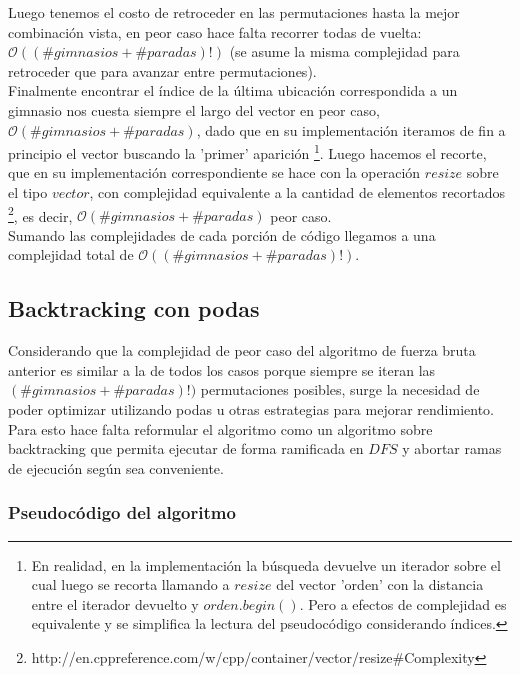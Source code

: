     Luego tenemos el costo de retroceder en las permutaciones hasta la mejor combinación vista, en peor caso hace falta recorrer todas de vuelta: $\mathcal{O}((\#gimnasios + \#paradas)!)$ (se asume la misma complejidad para retroceder que para avanzar entre permutaciones).
    \\

    Finalmente encontrar el índice de la última ubicación correspondida a un gimnasio nos cuesta siempre el largo del vector en peor caso, $\mathcal{O}(\#gimnasios + \#paradas)$, dado que en su implementación iteramos de fin a principio el vector buscando la 'primer' aparición \footnote{En realidad, en la implementación la búsqueda devuelve un iterador sobre el cual luego se recorta llamando a $resize$ del vector 'orden' con la distancia entre el iterador devuelto y $orden.begin()$. Pero a efectos de complejidad es equivalente y se simplifica la lectura del pseudocódigo considerando índices.}. Luego hacemos el recorte, que en su implementación correspondiente se hace con la operación $resize$ sobre el tipo $vector$, con complejidad equivalente a la cantidad de elementos recortados \footnote{http://en.cppreference.com/w/cpp/container/vector/resize\#Complexity}, es decir, $\mathcal{O}(\#gimnasios + \#paradas)$ peor caso.
    \\

    Sumando las complejidades de cada porción de código llegamos a una complejidad total de $\mathcal{O} ((\#gimnasios + \#paradas)!)$.

    \subsection{Backtracking con podas}

    Considerando que la complejidad de peor caso del algoritmo de fuerza bruta anterior es similar a la de todos los casos porque siempre se iteran las $(\#gimnasios + \#paradas)!)$ permutaciones posibles, surge la necesidad de poder optimizar utilizando podas u otras estrategias para mejorar rendimiento. Para esto hace falta reformular el algoritmo como un algoritmo sobre backtracking que permita ejecutar de forma ramificada en $DFS$ y abortar ramas de ejecución según sea conveniente.
    \\

    \subsubsection{Pseudocódigo del algoritmo}

